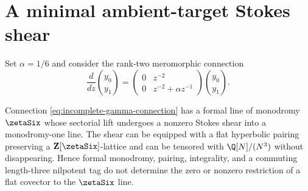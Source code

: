 \section{A minimal ambient-target Stokes shear}
\label{sec:incomplete-gamma}

Set \(\alpha=1/6\) and consider the rank-two meromorphic connection
\begin{equation}\label{eq:incomplete-gamma-connection}
 \frac{d}{dz}\binom{y_0}{y_1}=
 \begin{pmatrix}
 0&z^{-2}\\
 0&z^{-2}+\alpha z^{-1}
 \end{pmatrix}\binom{y_0}{y_1}.
\end{equation}

\begin{proposition}
\label{prop:incomplete-gamma}
Connection \eqref{eq:incomplete-gamma-connection} has a formal line of
monodromy \(\zetaSix\) whose sectorial
lift undergoes a nonzero Stokes shear into a monodromy-one line.  The shear
can be equipped with a flat hyperbolic pairing preserving a
\(\mathbf Z[\zetaSix]\)-lattice and can be tensored
with \(\Q[N]/(N^3)\) without disappearing.  Hence formal monodromy, pairing,
integrality, and a commuting length-three nilpotent tag do not determine the
zero or nonzero restriction of a flat covector to the \(\zetaSix\) line.
\end{proposition}

